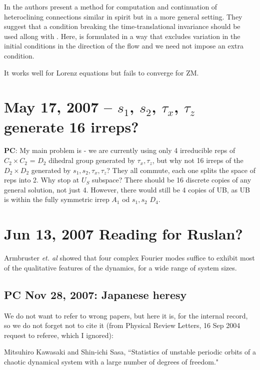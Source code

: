\documentclass[letter,10pt]{article}
\begin{document}
In  the authors present a method for computation and continuation
of heteroclining connections similar in spirit but in a more general setting. They suggest that a condition breaking the time-translational invariance should be used allong with . Here,
 is formulated in a way that excludes variation in the initial conditions in the direction
of the flow and we need not impose an extra condition.

It works well for Lorenz equations but fails to converge for ZM.

\section{May 17, 2007 -- $s_1$, $s_2$, $\tau_x$, $\tau_z$ generate 16 irreps?}

{\bf PC}: My main problem is - we are currently using only 4 irreducible reps
of $C_2 \times C_2$ = $D_2$ dihedral group generated by $\tau_x, \tau_z$,
but why not 16 irreps of
the $D_2 \times D_2$ generated by $s_1, s_2, \tau_x, \tau_z$?
They all commute, each one splits the space of reps into 2.
Why stop at $U_S$ subspace?
There should be 16 discrete copies of any
general solution, not just 4.
However, there would still be 4 copies of UB, as UB is within the
fully symmetric irrep $A_1$ od $s_1, s_2$ $D_4$.

\section{Jun 13, 2007 Reading for Ruslan?}

Armbruster {\em et. al} showed that four complex Fourier
modes suffice to exhibit most
of the qualitative features of the dynamics,
for a wide range of system sizes.

\subsection{PC Nov 28, 2007: Japanese heresy}

We do not want to refer to wrong papers, but here it is, for
the internal record, so we do not forget not to cite it
(from Physical Review Letters, 16 Sep 2004 request to referee,
which I ignored):

Mitsuhiro Kawasaki and Shin-ichi Sasa,
    ``Statistics of unstable periodic orbits of a chaotic dynamical system
    with a large number of degrees of freedom."
\end{document}
